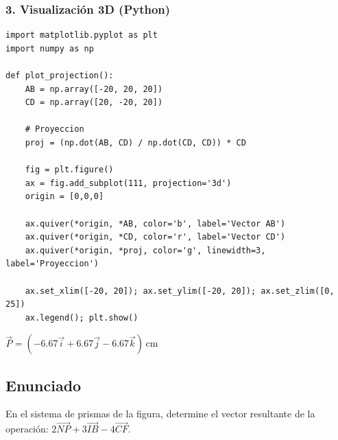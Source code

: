 \documentclass[12pt, a4paper]{article}
\begin{document}
\subsubsection*{3. Visualización 3D (Python)}
\begin{lstlisting}
import matplotlib.pyplot as plt
import numpy as np

def plot_projection():
    AB = np.array([-20, 20, 20])
    CD = np.array([20, -20, 20])
    
    # Proyeccion
    proj = (np.dot(AB, CD) / np.dot(CD, CD)) * CD
    
    fig = plt.figure()
    ax = fig.add_subplot(111, projection='3d')
    origin = [0,0,0]
    
    ax.quiver(*origin, *AB, color='b', label='Vector AB')
    ax.quiver(*origin, *CD, color='r', label='Vector CD')
    ax.quiver(*origin, *proj, color='g', linewidth=3, label='Proyeccion')
    
    ax.set_xlim([-20, 20]); ax.set_ylim([-20, 20]); ax.set_zlim([0, 25])
    ax.legend(); plt.show()
\end{lstlisting}

\begin{tcolorbox}[colback=green!5!white, colframe=green!50!black, title=Respuesta Final]
\centering \Large $\vec{P} = (-6.67\vec{i} + 6.67\vec{j} - 6.67\vec{k}) \, \text{cm}$
\end{tcolorbox}

\newpage


\subsection*{Enunciado}
En el sistema de prismas de la figura, determine el vector resultante de la operación: $2 \vec{NP} + 3 \vec{IB} - 4 \vec{CF}$.
\end{document}
